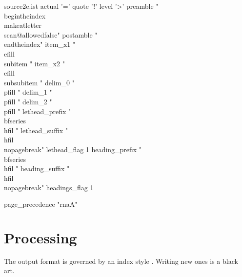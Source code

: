 \begin{filecontents}{source2e.ist}
actual '='
quote '!'
level '>'
preamble
"\n \\begin{theindex} \n \\makeatletter\\scan@allowedfalse\n"
postamble
"\n\n \\end{theindex}\n"
item_x1   "\\efill \n \\subitem "
item_x2   "\\efill \n \\subsubitem "
delim_0   "\\pfill "
delim_1   "\\pfill "
delim_2   "\\pfill "
lethead_prefix   "{\\bfseries\\hfil "
lethead_suffix   "\\hfil}\\nopagebreak\n"
lethead_flag       1
heading_prefix   "{\\bfseries\\hfil "
heading_suffix   "\\hfil}\\nopagebreak\n"
headings_flag       1

page_precedence "rnaA"
\end{filecontents}

\section{Processing}
The output format is governed by an index style . Writing new ones is a black art.

